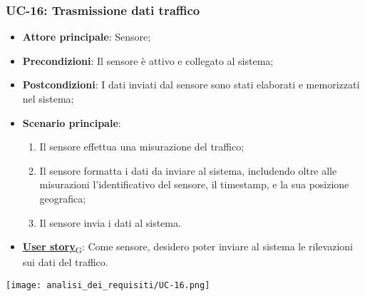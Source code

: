 \subsubsection{UC-16: Trasmissione dati traffico}
\begin{itemize}
	\item \textbf{Attore principale}: Sensore;
	\item \textbf{Precondizioni}: Il sensore è attivo e collegato al sistema;
	\item \textbf{Postcondizioni}: I dati inviati dal sensore sono stati elaborati e memorizzati nel sistema;
	\item \textbf{Scenario principale}:
	      \begin{enumerate}
		      \item Il sensore effettua una misurazione del traffico;
		      \item Il sensore formatta i dati da inviare al sistema, includendo oltre alle misurazioni l'identificativo del sensore,
		            il timestamp, e la sua posizione geografica;
		      \item Il sensore invia i dati al sistema.
	      \end{enumerate}
	\item \href{https://7last.github.io/docs/rtb/documentazione-interna/glossario\#user-story}{\textbf{User story}\textsubscript{G}}: Come sensore, desidero poter inviare al sistema le rilevazioni sui dati del traffico.
\end{itemize}

\begin{center}
	\texttt{[image: analisi\_dei\_requisiti/UC-16.png]}
\end{center}


